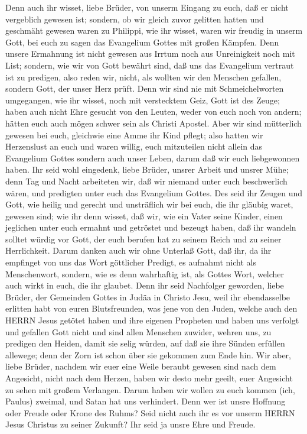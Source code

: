  Denn auch ihr wisset, liebe Brüder, von unserm Eingang zu
euch, daß er nicht vergeblich gewesen ist;  sondern, ob wir
gleich zuvor gelitten hatten und geschmäht gewesen waren zu Philippi,
wie ihr wisset, waren wir freudig in unserm Gott, bei euch zu sagen das
Evangelium Gottes mit großen Kämpfen.  Denn unsere Ermahnung
ist nicht gewesen aus Irrtum noch aus Unreinigkeit noch mit List;
 sondern, wie wir von Gott bewährt sind, daß uns das
Evangelium vertraut ist zu predigen, also reden wir, nicht, als wollten
wir den Menschen gefallen, sondern Gott, der unser Herz prüft.
 Denn wir sind nie mit Schmeichelworten umgegangen, wie ihr
wisset, noch mit verstecktem Geiz, Gott ist des Zeuge; 
haben auch nicht Ehre gesucht von den Leuten, weder von euch noch von
andern;  hätten euch auch mögen schwer sein als Christi
Apostel. Aber wir sind mütterlich gewesen bei euch, gleichwie eine Amme
ihr Kind pflegt;  also hatten wir Herzenslust an euch und
waren willig, euch mitzuteilen nicht allein das Evangelium Gottes
sondern auch unser Leben, darum daß wir euch liebgewonnen haben.
 Ihr seid wohl eingedenk, liebe Brüder, unsrer Arbeit und
unsrer Mühe; denn Tag und Nacht arbeiteten wir, daß wir niemand unter
euch beschwerlich wären, und predigten unter euch das Evangelium Gottes.
 Des seid ihr Zeugen und Gott, wie heilig und gerecht und
unsträflich wir bei euch, die ihr gläubig waret, gewesen sind;
 wie ihr denn wisset, daß wir, wie ein Vater seine Kinder,
einen jeglichen unter euch ermahnt und getröstet  und
bezeugt haben, daß ihr wandeln solltet würdig vor Gott, der euch berufen
hat zu seinem Reich und zu seiner Herrlichkeit.  Darum
danken auch wir ohne Unterlaß Gott, daß ihr, da ihr empfinget von uns
das Wort göttlicher Predigt, es aufnahmt nicht als Menschenwort,
sondern, wie es denn wahrhaftig ist, als Gottes Wort, welcher auch wirkt
in euch, die ihr glaubet.  Denn ihr seid Nachfolger
geworden, liebe Brüder, der Gemeinden Gottes in Judäa in Christo Jesu,
weil ihr ebendasselbe erlitten habt von euren Blutsfreunden, was jene
von den Juden,  welche auch den HERRN Jesus getötet haben
und ihre eigenen Propheten und haben uns verfolgt und gefallen Gott
nicht und sind allen Menschen zuwider,  wehren uns, zu
predigen den Heiden, damit sie selig würden, auf daß sie ihre Sünden
erfüllen allewege; denn der Zorn ist schon über sie gekommen zum Ende
hin.  Wir aber, liebe Brüder, nachdem wir euer eine Weile
beraubt gewesen sind nach dem Angesicht, nicht nach dem Herzen, haben
wir desto mehr geeilt, euer Angesicht zu sehen mit großem Verlangen.
 Darum haben wir wollen zu euch kommen (ich, Paulus)
zweimal, und Satan hat uns verhindert.  Denn wer ist unsre
Hoffnung oder Freude oder Krone des Ruhms? Seid nicht auch ihr es vor
unserm HERRN Jesus Christus zu seiner Zukunft?  Ihr seid ja
unsre Ehre und Freude.

